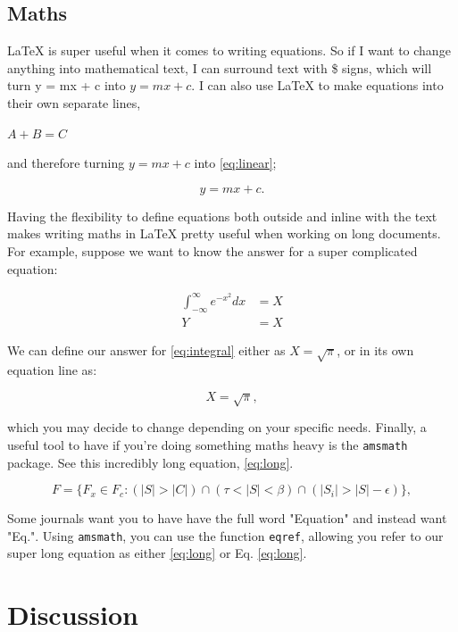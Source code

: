 \documentclass[a4paper]{article}
\begin{document}
\subsection{Maths}\label{ssec:math}

LaTeX is super useful when it comes to writing equations. So if I want to change anything into mathematical text, I can surround text with \$ signs, which will turn y = mx + c into $y = mx + c$. I can also use LaTeX to make equations into their own separate lines,

$A+B = C$

and therefore turning $y = mx + c$ into \autoref{eq:linear};

\begin{equation}\label{eq:linear}
    y = mx + c.
\end{equation}

Having the flexibility to define equations both outside and inline with the text makes writing maths in LaTeX pretty useful when working on long documents. For example, suppose we want to know the answer for a super complicated equation:

\begin{align}\label{eq:integral}
    \int^{\infty}_{-\infty} e^{-x^2} dx  &= X  \\
        Y  &= X
\end{align}

We can define our answer for \autoref{eq:integral} either as $X = \sqrt{\pi}$, or in its own equation line as:

\begin{equation}
    X = \sqrt{\pi},
\end{equation}

which you may decide to change depending on your specific needs. Finally, a useful tool to have if you're doing something maths heavy is the \texttt{amsmath} package. See this incredibly long equation, \autoref{eq:long}.

\begin{equation}\label{eq:long}
    F = \{F_{x} \in  F_{c} : (|S| > |C|) \cap 
(\tau  < |S| < \beta) \cap 
(|S_{i}| > |S| - \epsilon)
  \},
\end{equation}

Some journals want you to have have the full word "Equation" and instead want "Eq.". Using \texttt{amsmath}, you can use the function \texttt{eqref}, allowing you refer to our super long equation as either \autoref{eq:long} or Eq. \eqref{eq:long}.

\section{Discussion} \label{sec:disc}
\end{document}
